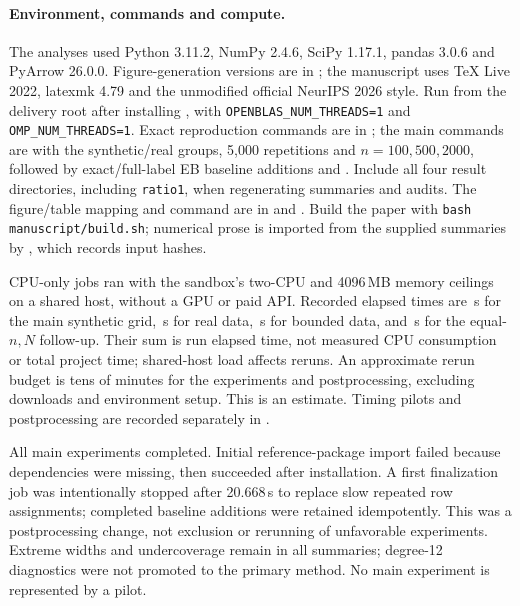 \paragraph{Environment, commands and compute.}
The analyses used Python 3.11.2, NumPy 2.4.6, SciPy 1.17.1, pandas 3.0.6 and PyArrow 26.0.0. Figure-generation versions are in ; the manuscript uses TeX Live 2022, latexmk 4.79 and the unmodified official NeurIPS 2026 style. Run from the delivery root after installing , with \texttt{OPENBLAS\_NUM\_THREADS=1} and \texttt{OMP\_NUM\_THREADS=1}. Exact reproduction commands are in ; the main commands are  with the synthetic/real groups, 5,000 repetitions and $n=100,500,2000$, followed by exact/full-label EB baseline additions and . Include all four result directories, including \texttt{ratio1}, when regenerating summaries and audits. The figure/table mapping and command are in  and . Build the paper with \texttt{bash manuscript/build.sh}; numerical prose is imported from the supplied summaries by , which records input hashes.

CPU-only jobs ran with the sandbox's two-CPU and 4096\,MB memory ceilings on a shared host, without a GPU or paid API. Recorded elapsed times are \SyntheticSeconds{}\,s for the main synthetic grid, \RealSeconds{}\,s for real data, \BoundedRunSeconds{}\,s for bounded data, and \RatioRunSeconds{}\,s for the equal-$n,N$ follow-up. Their sum is run elapsed time, not measured CPU consumption or total project time; shared-host load affects reruns. An approximate rerun budget is tens of minutes for the experiments and postprocessing, excluding downloads and environment setup. This is an estimate. Timing pilots and postprocessing are recorded separately in .

All main experiments completed. Initial reference-package import failed because dependencies were missing, then succeeded after installation. A first finalization job was intentionally stopped after 20.668\,s to replace slow repeated row assignments; completed baseline additions were retained idempotently. This was a postprocessing change, not exclusion or rerunning of unfavorable experiments. Extreme widths and undercoverage remain in all summaries; degree-12 diagnostics were not promoted to the primary method. No main experiment is represented by a pilot.

